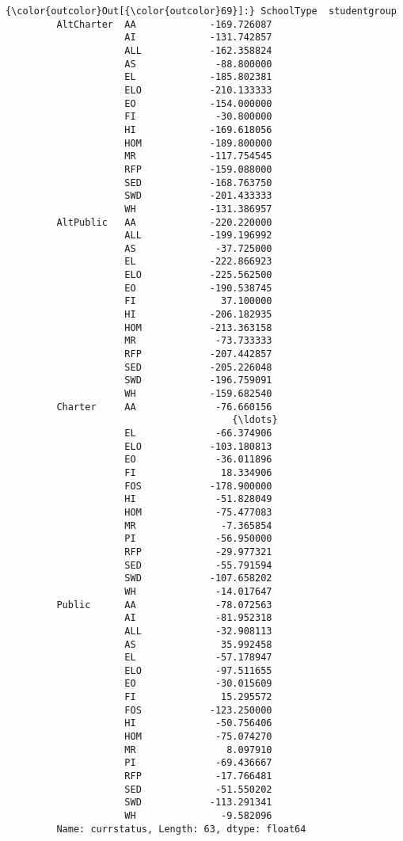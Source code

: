 \documentclass[11pt]{article}
\begin{document}
\begin{Verbatim}[commandchars=\\\{\}]
{\color{outcolor}Out[{\color{outcolor}69}]:} SchoolType  studentgroup
         AltCharter  AA             -169.726087
                     AI             -131.742857
                     ALL            -162.358824
                     AS              -88.800000
                     EL             -185.802381
                     ELO            -210.133333
                     EO             -154.000000
                     FI              -30.800000
                     HI             -169.618056
                     HOM            -189.800000
                     MR             -117.754545
                     RFP            -159.088000
                     SED            -168.763750
                     SWD            -201.433333
                     WH             -131.386957
         AltPublic   AA             -220.220000
                     ALL            -199.196992
                     AS              -37.725000
                     EL             -222.866923
                     ELO            -225.562500
                     EO             -190.538745
                     FI               37.100000
                     HI             -206.182935
                     HOM            -213.363158
                     MR              -73.733333
                     RFP            -207.442857
                     SED            -205.226048
                     SWD            -196.759091
                     WH             -159.682540
         Charter     AA              -76.660156
                                        {\ldots}    
                     EL              -66.374906
                     ELO            -103.180813
                     EO              -36.011896
                     FI               18.334906
                     FOS            -178.900000
                     HI              -51.828049
                     HOM             -75.477083
                     MR               -7.365854
                     PI              -56.950000
                     RFP             -29.977321
                     SED             -55.791594
                     SWD            -107.658202
                     WH              -14.017647
         Public      AA              -78.072563
                     AI              -81.952318
                     ALL             -32.908113
                     AS               35.992458
                     EL              -57.178947
                     ELO             -97.511655
                     EO              -30.015609
                     FI               15.295572
                     FOS            -123.250000
                     HI              -50.756406
                     HOM             -75.074270
                     MR                8.097910
                     PI              -69.436667
                     RFP             -17.766481
                     SED             -51.550202
                     SWD            -113.291341
                     WH               -9.582096
         Name: currstatus, Length: 63, dtype: float64
\end{Verbatim}
            
\end{document}
